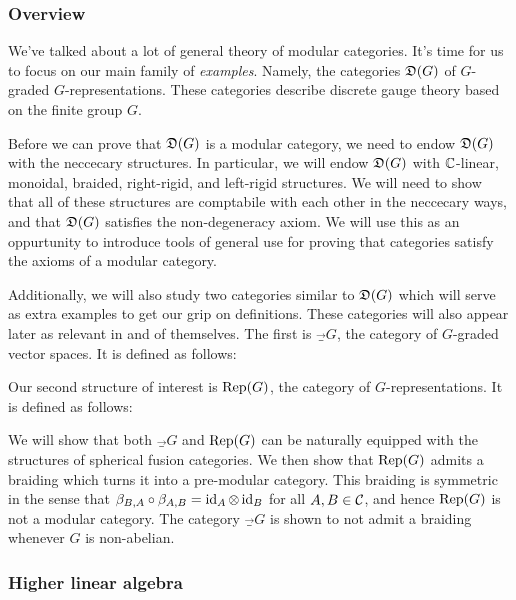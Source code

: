 \subsubsection{Overview}

We've talked about a lot of general theory of modular categories. It's time for us to focus on our main family of {\em examples}. Namely, the categories ${\mathfrak D}(G)$ of $G$-graded $G$-representations. These categories describe discrete gauge theory based on the finite group $G$.

Before we can prove that ${\mathfrak D}(G)$ is a modular category, we need to endow ${\mathfrak D}(G)$ with the neccecary structures. In particular, we will endow ${\mathfrak D}(G)$ with ${\mathbb C}$-linear, monoidal, braided, right-rigid, and left-rigid structures. We will need to show that all of these structures are comptabile with each other in the neccecary ways, and that ${\mathfrak D}(G)$ satisfies the non-degeneracy axiom. We will use this as an oppurtunity to introduce tools of general use for proving that categories satisfy the axioms of a modular category.

Additionally, we will also study two categories similar to ${\mathfrak D}(G)$ which will serve as extra examples to get our grip on definitions. These categories will also appear later as relevant in and of themselves. The first is $\Vec_G$, the category of $G$-graded vector spaces. It is defined as follows:


Our second structure of interest is $\operatorname{Rep}(G)$, the category of $G$-representations. It is defined as follows:


We will show that both $\Vec_G$ and $\operatorname{Rep}(G)$ can be naturally equipped with the structures of spherical fusion categories. We then show that $\operatorname{Rep}(G)$ admits a braiding which turns it into a pre-modular category. This braiding is symmetric in the sense that $\beta_{B,A}\circ \beta_{A,B}=\operatorname{id}_{A}\otimes \operatorname{id}_{B}$ for all $A,B\in {\mathcal C}$, and hence $\operatorname{Rep}(G)$ is not a modular category. The category $\Vec_G$ is shown to not admit a braiding whenever $G$ is non-abelian.


\subsubsection{Higher linear algebra}


